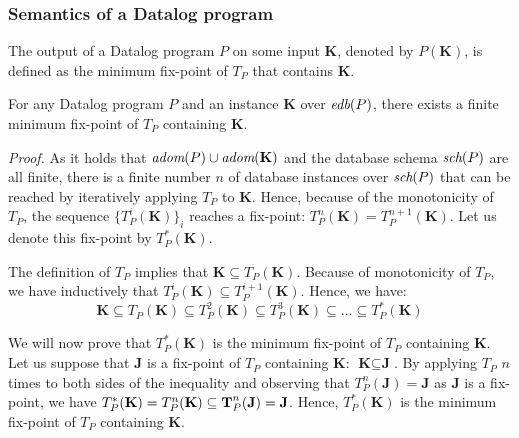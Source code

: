 \subsubsection{Semantics of a Datalog program}
The output of a Datalog program $P$ on some input $\textbf{K}$, denoted by $P(\textbf{K})$, is defined as the minimum fix-point of $T_P$ that contains $\textbf{K}$.

\begin{thm}\label{t:datalogfixpointsem}
For any Datalog program $P$ and an instance $\textbf{K}$ over $\textit{edb}(P)$, there exists a finite minimum fix-point of $T_P$ containing $\textbf{K}$.
\end{thm}
\emph{Proof.}
As it holds that $\textit{adom}(P) \cup \textit{adom}(\textbf{K})$ and the database schema $\textit{sch}(P)$ are all finite, there is a finite number $n$ of database instances over $\textit{sch}(P)$ that can be reached by iteratively applying $T_P$ to $\textbf{K}$. Hence, because of the monotonicity of $T_P$, the sequence $\{T_P^i(\textbf{K})\}_i$ reaches a fix-point: $T_P^n(\textbf{K}) = T_P^{n+1}(\textbf{K})$. Let us denote this fix-point by $T_P^*(\textbf{K})$.

The definition of $T_P$ implies that $\textbf{K} \subseteq T_P(\textbf{K})$.
Because of monotonicity of $T_P$, we have inductively that $T_P^i(\textbf{K}) \subseteq T_P^{i+1}(\textbf{K})$.
Hence, we have:
$$\textbf{K} \subseteq T_P(\textbf{K}) \subseteq T_P^2(\textbf{K}) \subseteq T_P^3(\textbf{K}) \subseteq \dots \subseteq T_P^*(\textbf{K})$$

We will now prove that $T_P^*(\textbf{K})$ is the minimum fix-point of $T_P$ containing $\textbf{K}$. Let us suppose that $\textbf{J}$ is a fix-point of $T_P$ containing  $\textbf{K}$:  $\textbf{K} \subseteq \textbf{J}$. By applying $T_P$ $n$ times to both sides of the inequality and observing that $T_P^n(\textbf{J}) = \textbf{J}$ as $\textbf{J}$ is a fix-point, we have $T_P^*(\textbf{K}) = T_P^n(\textbf{K}) \subseteq \textbf T_P^n(\textbf{J}) = \textbf{J}$. Hence, $T_P^*(\textbf{K})$ is the minimum fix-point of $T_P$ containing $\textbf{K}$.


